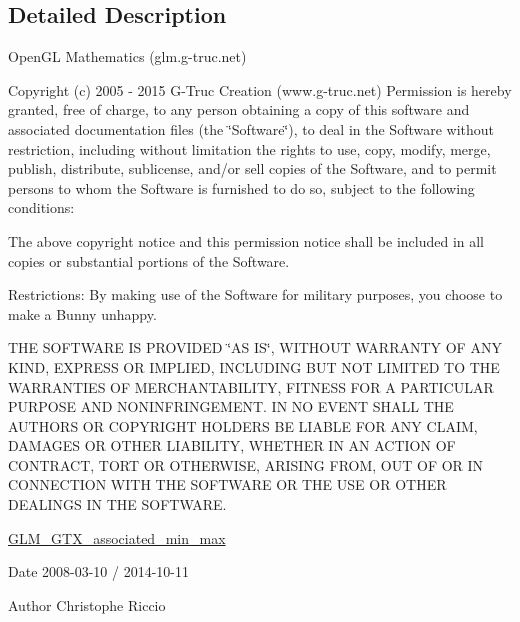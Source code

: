\subsection{Detailed Description}
Open\-G\-L Mathematics (glm.\-g-\/truc.\-net)

Copyright (c) 2005 -\/ 2015 G-\/\-Truc Creation (www.\-g-\/truc.\-net) Permission is hereby granted, free of charge, to any person obtaining a copy of this software and associated documentation files (the \char`\"{}\-Software\char`\"{}), to deal in the Software without restriction, including without limitation the rights to use, copy, modify, merge, publish, distribute, sublicense, and/or sell copies of the Software, and to permit persons to whom the Software is furnished to do so, subject to the following conditions\-:

The above copyright notice and this permission notice shall be included in all copies or substantial portions of the Software.

Restrictions\-: By making use of the Software for military purposes, you choose to make a Bunny unhappy.

T\-H\-E S\-O\-F\-T\-W\-A\-R\-E I\-S P\-R\-O\-V\-I\-D\-E\-D \char`\"{}\-A\-S I\-S\char`\"{}, W\-I\-T\-H\-O\-U\-T W\-A\-R\-R\-A\-N\-T\-Y O\-F A\-N\-Y K\-I\-N\-D, E\-X\-P\-R\-E\-S\-S O\-R I\-M\-P\-L\-I\-E\-D, I\-N\-C\-L\-U\-D\-I\-N\-G B\-U\-T N\-O\-T L\-I\-M\-I\-T\-E\-D T\-O T\-H\-E W\-A\-R\-R\-A\-N\-T\-I\-E\-S O\-F M\-E\-R\-C\-H\-A\-N\-T\-A\-B\-I\-L\-I\-T\-Y, F\-I\-T\-N\-E\-S\-S F\-O\-R A P\-A\-R\-T\-I\-C\-U\-L\-A\-R P\-U\-R\-P\-O\-S\-E A\-N\-D N\-O\-N\-I\-N\-F\-R\-I\-N\-G\-E\-M\-E\-N\-T. I\-N N\-O E\-V\-E\-N\-T S\-H\-A\-L\-L T\-H\-E A\-U\-T\-H\-O\-R\-S O\-R C\-O\-P\-Y\-R\-I\-G\-H\-T H\-O\-L\-D\-E\-R\-S B\-E L\-I\-A\-B\-L\-E F\-O\-R A\-N\-Y C\-L\-A\-I\-M, D\-A\-M\-A\-G\-E\-S O\-R O\-T\-H\-E\-R L\-I\-A\-B\-I\-L\-I\-T\-Y, W\-H\-E\-T\-H\-E\-R I\-N A\-N A\-C\-T\-I\-O\-N O\-F C\-O\-N\-T\-R\-A\-C\-T, T\-O\-R\-T O\-R O\-T\-H\-E\-R\-W\-I\-S\-E, A\-R\-I\-S\-I\-N\-G F\-R\-O\-M, O\-U\-T O\-F O\-R I\-N C\-O\-N\-N\-E\-C\-T\-I\-O\-N W\-I\-T\-H T\-H\-E S\-O\-F\-T\-W\-A\-R\-E O\-R T\-H\-E U\-S\-E O\-R O\-T\-H\-E\-R D\-E\-A\-L\-I\-N\-G\-S I\-N T\-H\-E S\-O\-F\-T\-W\-A\-R\-E.

\hyperlink{group__gtx__associated__min__max}{G\-L\-M\-\_\-\-G\-T\-X\-\_\-associated\-\_\-min\-\_\-max}

\begin{DoxyDate}{Date}
2008-\/03-\/10 / 2014-\/10-\/11 
\end{DoxyDate}
\begin{DoxyAuthor}{Author}
Christophe Riccio 
\end{DoxyAuthor}
